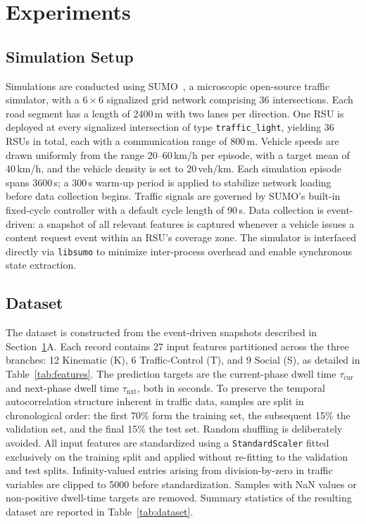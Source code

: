 \documentclass[journal]{IEEEtran}
\begin{document}
\section{Experiments} \label{sec:experiments}

\subsection{Simulation Setup}
Simulations are conducted using SUMO~\cite{SUMO}, a microscopic open-source traffic simulator, with a $6{\times}6$ signalized grid network comprising 36 intersections.
Each road segment has a length of 2400\,m with two lanes per direction.
One RSU is deployed at every signalized intersection of type \texttt{traffic\_light}, yielding 36 RSUs in total, each with a communication range of 800\,m.
Vehicle speeds are drawn uniformly from the range 20--60\,km/h per episode, with a target mean of 40\,km/h, and the vehicle density is set to 20\,veh/km.
Each simulation episode spans 3600\,s; a 300\,s warm-up period is applied to stabilize network loading before data collection begins.
Traffic signals are governed by SUMO's built-in fixed-cycle controller with a default cycle length of 90\,s.
Data collection is event-driven: a snapshot of all relevant features is captured whenever a vehicle issues a content request event within an RSU's coverage zone.
The simulator is interfaced directly via \texttt{libsumo} to minimize inter-process overhead and enable synchronous state extraction.

\subsection{Dataset}
The dataset is constructed from the event-driven snapshots described in Section~\ref{sec:experiments}A.
Each record contains 27 input features partitioned across the three branches: 12 Kinematic (K), 6 Traffic-Control (T), and 9 Social (S), as detailed in Table~\ref{tab:features}.
The prediction targets are the current-phase dwell time $\tau_\text{cur}$ and next-phase dwell time $\tau_\text{nxt}$, both in seconds.
To preserve the temporal autocorrelation structure inherent in traffic data, samples are split in chronological order: the first 70\% form the training set, the subsequent 15\% the validation set, and the final 15\% the test set.
Random shuffling is deliberately avoided.
All input features are standardized using a \texttt{StandardScaler} fitted exclusively on the training split and applied without re-fitting to the validation and test splits.
Infinity-valued entries arising from division-by-zero in traffic variables are clipped to 5000 before standardization.
Samples with NaN values or non-positive dwell-time targets are removed.
Summary statistics of the resulting dataset are reported in Table~\ref{tab:dataset}.
\end{document}
